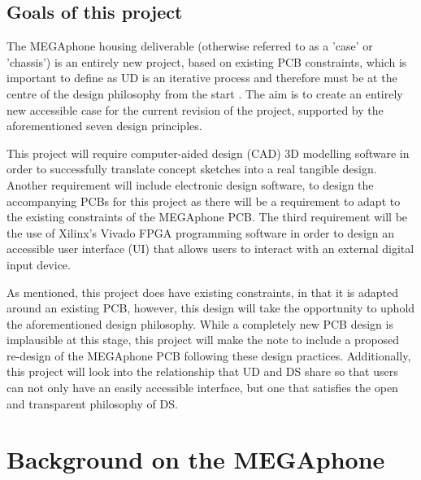 \subsection{Goals of this project}
The MEGAphone housing deliverable (otherwise referred to as a 'case' or 'chassis') is an entirely new project, based on existing PCB constraints, which is important to define as UD is an iterative process and therefore must be at the centre of the design philosophy from the start \cite{incldesign}.
The aim is to create an entirely new accessible case for the current revision of the project, supported by the aforementioned seven design principles.

This project will require computer-aided design (CAD) 3D modelling software in order to successfully translate concept sketches into a real tangible design.
Another requirement will include electronic design software, to design the accompanying PCBs for this project as there will be a requirement to adapt to the existing constraints of the MEGAphone PCB.
The third requirement will be the use of Xilinx's Vivado FPGA programming software in order to design an accessible user interface (UI) that allows users to interact with an external digital input device.

As mentioned, this project does have existing constraints, in that it is adapted around an existing PCB, however, this design will take the opportunity to uphold the aforementioned design philosophy.
While a completely new PCB design is implausible at this stage, this project will make the note to include a proposed re-design of the MEGAphone PCB following these design practices.
Additionally, this project will look into the relationship that UD and DS share so that users can not only have an easily accessible interface, but one that satisfies the open and transparent philosophy of DS.

\section{Background on the MEGAphone}

